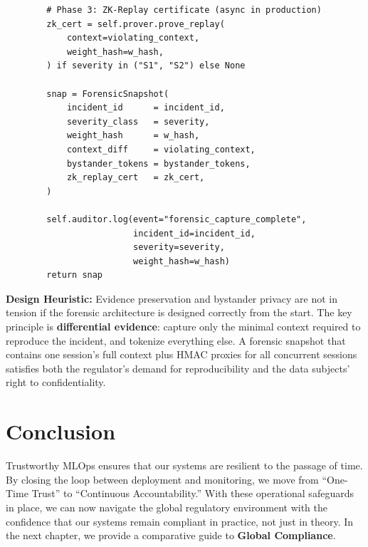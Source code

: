 \begin{lstlisting}
        # Phase 3: ZK-Replay certificate (async in production)
        zk_cert = self.prover.prove_replay(
            context=violating_context,
            weight_hash=w_hash,
        ) if severity in ("S1", "S2") else None

        snap = ForensicSnapshot(
            incident_id      = incident_id,
            severity_class   = severity,
            weight_hash      = w_hash,
            context_diff     = violating_context,
            bystander_tokens = bystander_tokens,
            zk_replay_cert   = zk_cert,
        )

        self.auditor.log(event="forensic_capture_complete",
                         incident_id=incident_id,
                         severity=severity,
                         weight_hash=w_hash)
        return snap
\end{lstlisting}

\begin{svgraybox}
\textbf{Design Heuristic:} Evidence preservation and bystander privacy are not in tension if the forensic architecture is designed correctly from the start. The key principle is \textbf{differential evidence}: capture only the minimal context required to reproduce the incident, and tokenize everything else. A forensic snapshot that contains one session's full context plus HMAC proxies for all concurrent sessions satisfies both the regulator's demand for reproducibility and the data subjects' right to confidentiality.
\end{svgraybox}

\section{Conclusion}
\label{sec:conclusion_mlops}

Trustworthy MLOps ensures that our systems are resilient to the passage of time. By closing the loop between deployment and monitoring, we move from ``One-Time Trust'' to ``Continuous Accountability.'' With these operational safeguards in place, we can now navigate the global regulatory environment with the confidence that our systems remain compliant in practice, not just in theory. In the next chapter, we provide a comparative guide to \textbf{Global Compliance}.
